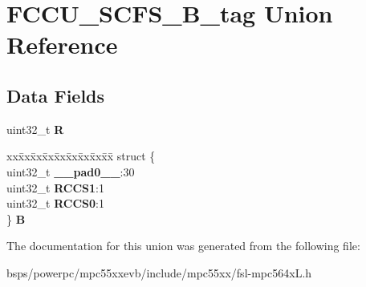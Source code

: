 \hypertarget{unionFCCU__SCFS__32B__tag}{}\section{F\+C\+C\+U\+\_\+\+S\+C\+F\+S\+\_\+B\+\_\+tag Union Reference}
\label{unionFCCU__SCFS__32B__tag}
\subsection*{Data Fields}
\begin{DoxyCompactItemize}
\item 
\mbox{\label{unionFCCU__SCFS__32B__tag_a916859aee5b4b798fe0aef76d387839c}} 
uint32\+\_\+t {\bfseries R}
\item 
\mbox{\label{unionFCCU__SCFS__32B__tag_a0df869ff049096eda14be32d70abdc36}} 
\begin{tabbing}
xx\=xx\=xx\=xx\=xx\=xx\=xx\=xx\=xx\=\kill
struct \{\\
\>uint32\_t {\bfseries \_\_pad0\_\_}:30\\
\>uint32\_t {\bfseries RCCS1}:1\\
\>uint32\_t {\bfseries RCCS0}:1\\
\} {\bfseries B}\\

\end{tabbing}\end{DoxyCompactItemize}


The documentation for this union was generated from the following file\+:\begin{DoxyCompactItemize}
\item 
bsps/powerpc/mpc55xxevb/include/mpc55xx/fsl-\/mpc564x\+L.\+h\end{DoxyCompactItemize}
